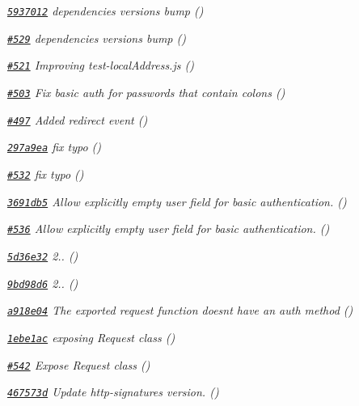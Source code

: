 \begin{DoxyItemize}
\item {\itshape \href{https://github.com/mikeal/request/commit/59370123b22e8c971e4ee48c3d0caf920d890bda}{\tt 5937012} dependencies versions bump ()}
\item {\itshape \href{https://github.com/mikeal/request/pull/529}{\tt \#529} dependencies versions bump ()}
\item {\itshape \href{https://github.com/mikeal/request/pull/521}{\tt \#521} Improving test-\/local\+Address.\+js ()}
\item {\itshape \href{https://github.com/mikeal/request/pull/503}{\tt \#503} Fix basic auth for passwords that contain colons ()}
\item {\itshape \href{https://github.com/mikeal/request/pull/497}{\tt \#497} Added redirect event ()}
\item {\itshape \href{https://github.com/mikeal/request/commit/297a9ea827655e5fb406a86907bb0d89b01deae8}{\tt 297a9ea} fix typo ()}
\item {\itshape \href{https://github.com/mikeal/request/pull/532}{\tt \#532} fix typo ()}
\item {\itshape \href{https://github.com/mikeal/request/commit/3691db5a2d0981d4aeabfda5b988a5c69074e187}{\tt 3691db5} Allow explicitly empty user field for basic authentication. ()}
\item {\itshape \href{https://github.com/mikeal/request/pull/536}{\tt \#536} Allow explicitly empty user field for basic authentication. ()}
\item {\itshape \href{https://github.com/mikeal/request/commit/5d36e324047f79cbbf3bb9b71fef633f02b36367}{\tt 5d36e32} 2.. ()}
\item {\itshape \href{https://github.com/mikeal/request/commit/9bd98d6052f222aa348635c1acb2e2c99eed0f8c}{\tt 9bd98d6} 2.. ()}
\item {\itshape \href{https://github.com/mikeal/request/commit/a918e04a8d767a2948567ea29ed3fdd1650c16b1}{\tt a918e04} The exported request function doesn\textquotesingle{}t have an auth method ()}
\item {\itshape \href{https://github.com/mikeal/request/commit/1ebe1ac2f78e8a6149c03ce68fcb23d56df2316e}{\tt 1ebe1ac} exposing Request class ()}
\item {\itshape \href{https://github.com/mikeal/request/pull/542}{\tt \#542} Expose Request class ()}
\item {\itshape \href{https://github.com/mikeal/request/commit/467573d17b4db5f93ed425ace0594370a7820c7c}{\tt 467573d} Update http-\/signatures version. ()}

\end{DoxyItemize}
